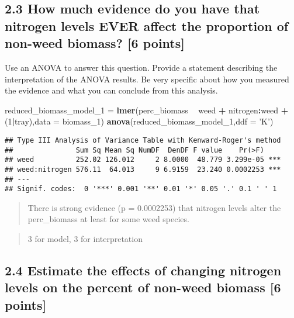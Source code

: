 \documentclass[
]{article}
\newenvironment{Shaded}{\begin{snugshade}}{\end{snugshade}}
\newcommand{\DataTypeTok}[1]{\textcolor[rgb]{0.13,0.29,0.53}{#1}}
\newcommand{\DecValTok}[1]{\textcolor[rgb]{0.00,0.00,0.81}{#1}}
\newcommand{\KeywordTok}[1]{\textcolor[rgb]{0.13,0.29,0.53}{\textbf{#1}}}
\newcommand{\NormalTok}[1]{#1}
\newcommand{\OperatorTok}[1]{\textcolor[rgb]{0.81,0.36,0.00}{\textbf{#1}}}
\newcommand{\StringTok}[1]{\textcolor[rgb]{0.31,0.60,0.02}{#1}}
\begin{document}
\hypertarget{how-much-evidence-do-you-have-that-nitrogen-levels-ever-affect-the-proportion-of-non-weed-biomass-6-points}{%
\subsection{2.3 How much evidence do you have that nitrogen levels EVER
affect the proportion of non-weed biomass? {[}6
points{]}}\label{how-much-evidence-do-you-have-that-nitrogen-levels-ever-affect-the-proportion-of-non-weed-biomass-6-points}}

Use an ANOVA to answer this question. Provide a statement describing the
interpretation of the ANOVA results. Be very specific about how you
measured the evidence and what you can conclude from this analysis.

\begin{Shaded}
\begin{Highlighting}[]
\NormalTok{reduced_biomass_model_}\DecValTok{1}\NormalTok{ =}\StringTok{ }\KeywordTok{lmer}\NormalTok{(perc_biomass }\OperatorTok{~}\StringTok{ }\NormalTok{weed }\OperatorTok{+}\StringTok{ }\NormalTok{nitrogen}\OperatorTok{:}\NormalTok{weed }\OperatorTok{+}\StringTok{ }\NormalTok{(}\DecValTok{1}\OperatorTok{|}\NormalTok{tray),}\DataTypeTok{data =}\NormalTok{ biomass_}\DecValTok{1}\NormalTok{)}
\KeywordTok{anova}\NormalTok{(reduced_biomass_model_}\DecValTok{1}\NormalTok{,}\DataTypeTok{ddf =} \StringTok{'K'}\NormalTok{)}
\end{Highlighting}
\end{Shaded}

\begin{verbatim}
## Type III Analysis of Variance Table with Kenward-Roger's method
##               Sum Sq Mean Sq NumDF  DenDF F value    Pr(>F)    
## weed          252.02 126.012     2 8.0000  48.779 3.299e-05 ***
## weed:nitrogen 576.11  64.013     9 6.9159  23.240 0.0002253 ***
## ---
## Signif. codes:  0 '***' 0.001 '**' 0.01 '*' 0.05 '.' 0.1 ' ' 1
\end{verbatim}

\begin{quote}
There is strong evidence (p = 0.0002253) that nitrogen levels alter the
perc\_biomass at least for some weed species.
\end{quote}

\begin{quote}
3 for model, 3 for interpretation
\end{quote}

\hypertarget{estimate-the-effects-of-changing-nitrogen-levels-on-the-percent-of-non-weed-biomass-6-points}{%
\subsection{2.4 Estimate the effects of changing nitrogen levels on the
percent of non-weed biomass {[}6
points{]}}\label{estimate-the-effects-of-changing-nitrogen-levels-on-the-percent-of-non-weed-biomass-6-points}}
\end{document}
